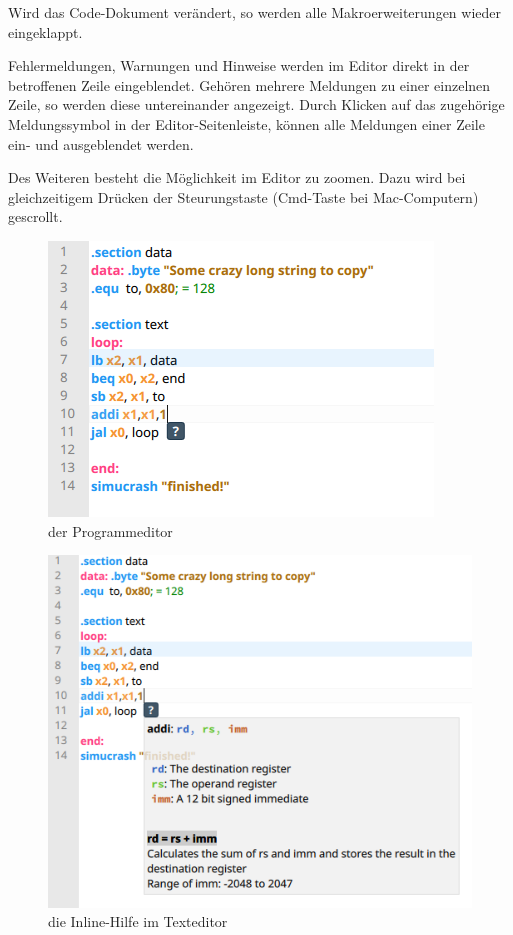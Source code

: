 Wird das Code-Dokument verändert, so werden alle Makroerweiterungen wieder eingeklappt.

Fehlermeldungen, Warnungen und Hinweise werden im Editor direkt in der betroffenen Zeile eingeblendet. Gehören mehrere Meldungen zu einer einzelnen Zeile, so werden diese untereinander angezeigt. Durch Klicken auf das zugehörige Meldungssymbol in der Editor-Seitenleiste, können alle Meldungen einer Zeile ein- und ausgeblendet werden.

Des Weiteren besteht die Möglichkeit im Editor zu zoomen. Dazu wird bei gleichzeitigem
Drücken der Steurungstaste (Cmd-Taste bei Mac-Computern) gescrollt.

\begin{figure}[ht]
	\centering
  \includegraphics[scale=1]{Images/Editor}
	\caption{der Programmeditor}
	\label{Editor}
\end{figure}


\begin{figure}[ht]
	\centering
  \includegraphics[scale=1]{Images/Editor_help}
	\caption{die Inline-Hilfe im Texteditor}
	\label{Editor_Help}
\end{figure}



